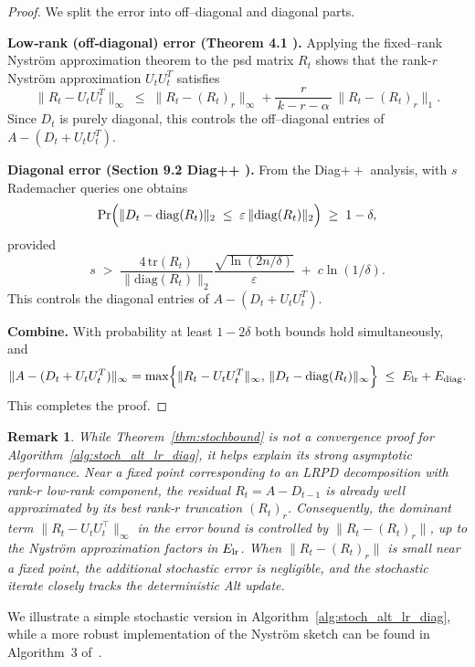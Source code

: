 \documentclass[final,hidelinks,onefignum,onetabnum]{siamart250211}
\providecommand{\tr}{\mathrm{tr}}
\providecommand{\diag}{\mathrm{diag}}
\providecommand{\1}{\mathbf{1}}
\newtheorem{rmk}{Remark}[section]
\theoremstyle{plain}
\begin{document}
\begin{proof}
We split the error into off–diagonal and diagonal parts.

\textbf{Low‐rank (off‐diagonal) error (Theorem 4.1 \cite{tropp2017fixed}).}  
Applying the fixed–rank Nyström approximation theorem to the psd matrix \(R_t\) shows that the rank-\(r\) Nyström approximation \(U_tU_t^T\) satisfies
\[
\|R_t - U_tU_t^T\|_{\infty}
\;\le\;
\|R_t - (R_t)_r\|_{\infty}
+\frac{r}{\,k - r - \alpha\,}\,\|R_t - (R_t)_r\|_{1}.
\]
Since \(D_t\) is purely diagonal, this controls the off–diagonal entries of \(A - (D_t + U_tU_t^T)\).

\textbf{Diagonal error (Section 9.2 Diag++ \cite{baston2022stochastic}).}  
From the Diag\(++\) analysis, with \(s\) Rademacher queries one obtains
\[
\Pr\Bigl(\|D_t - \diag(R_t)\|_{2}
\;\le\;
\varepsilon\,\|\diag(R_t)\|_{2}\Bigr)\;\ge\;1-\delta,
\]
provided 
\[
s \;>\; \frac{4\,\tr(R_t)}{\|\diag(R_t)\|_{2}}
        \frac{\sqrt{\ln(2n/\delta)}}{\varepsilon} \;+\; c\ln(1/\delta).
\]
This controls the diagonal entries of \(A - (D_t + U_tU_t^T)\).

\textbf{Combine.}  
With probability at least \(1-2\delta\) both bounds hold simultaneously, and
\[
\|A - (D_t + U_tU_t^T)\|_{\infty}
= \max\Bigl\{\|R_t - U_tU_t^T\|_{\infty},\,
             \|D_t - \diag(R_t)\|_{\infty}\Bigr\}
\;\le\;
E_{\rm lr} + E_{\rm diag}.
\]
This completes the proof.
\end{proof}


\begin{rmk}
    While Theorem~\ref{thm:stochbound} is not a convergence proof for Algorithm~\ref{alg:stoch_alt_lr_diag},
    it helps explain its strong asymptotic performance. Near a fixed point corresponding to an LRPD
    decomposition with rank-$r$ low-rank component, the residual $R_t = A - D_{t-1}$ is already well
    approximated by its best rank-$r$ truncation $(R_t)_r$. Consequently, the dominant term
    $\|R_t - U_tU_t^\top\|_\infty$ in the error bound is controlled by
    $\|R_t - (R_t)_r\|$, up to the Nyström approximation factors in $E_{\rm lr}$. When
    $\|R_t - (R_t)_r\|$ is small near a fixed point,
    the additional stochastic error is negligible, and the stochastic iterate closely tracks
    the deterministic Alt update.
\end{rmk}


We illustrate a simple stochastic version in Algorithm~\ref{alg:stoch_alt_lr_diag}, while a more robust implementation of the Nyström sketch can be found in Algorithm~3 of~\cite{tropp2017fixed}.
\end{document}
